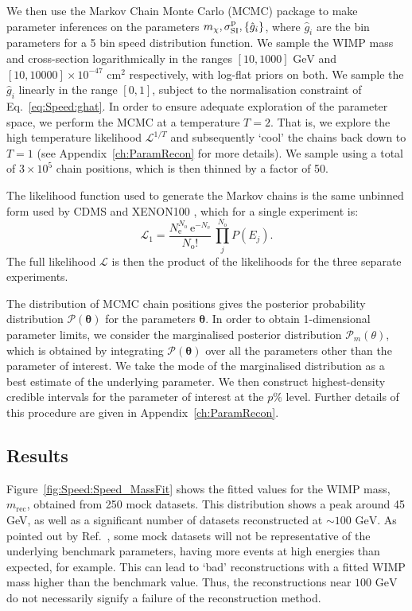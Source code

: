  We then use the Markov Chain Monte Carlo (MCMC) package \cosmomc \cite{Lewis:2002} to make parameter inferences on the parameters $\mchi, \sigmapsi, \left\{\hat{g}_i\right\}$, where $\hat{g}_i$ are the bin parameters for a 5 bin speed distribution function. We sample the WIMP mass and cross-section logarithmically in the ranges \([10, 1000] \textrm{ GeV}\) and \([10, 10000] \times 10^{-47} \textrm{ cm}^2\) respectively, with log-flat priors on both. We sample the $\hat{g}_i$ linearly in the range $[0,1]$, subject to the normalisation constraint of Eq.~\ref{eq:Speed:ghat}. In order to ensure adequate exploration of the parameter space, we perform the MCMC at a temperature $T=2$. That is, we explore the high temperature likelihood $\mathcal{L}^{1/T}$ and subsequently `cool' the chains back down to $T=1$ (see Appendix~\ref{ch:ParamRecon} for more details). We sample using a total of $3 \times 10^5$ chain positions, which is then thinned by a factor of 50.

The likelihood function used to generate the Markov chains is the same unbinned form used by CDMS \cite{Ahmed:2009b} and XENON100 \cite{Aprile:2011}, which for a single experiment is:
\begin{equation}
\label{eq:Speed:unbinnedL}
\mathcal{L}_1 = \frac{N_\textrm{e}^{N_\textrm{o}}\, \textrm{e}^{-N_\textrm{e}}}{N_\textrm{o}!} \, \prod_j^{N_\textrm{o}} P(E_j).
\end{equation} 
The full likelihood \(\mathcal{L}\) is then the product of the likelihoods for the three separate experiments.

The distribution of MCMC chain positions gives the posterior probability distribution $\mathcal{P}(\mathbf{\theta})$ for the parameters $\mathbf{\theta}$. In order to obtain 1-dimensional parameter limits, we consider the marginalised posterior distribution $\mathcal{P}_m(\theta)$, which is obtained by integrating $\mathcal{P}(\mathbf{\theta})$ over all the parameters other than the parameter of interest. We take the mode of the marginalised distribution as a best estimate of the underlying parameter. We then construct highest-density credible intervals for the parameter of interest at the $p\%$ level. Further details of this procedure are given in Appendix~\ref{ch:ParamRecon}. 

\subsection{Results}
Figure~\ref{fig:Speed:Speed_MassFit} shows the fitted values for the WIMP mass, \(m_\textrm{rec}\), obtained from 250 mock datasets. This distribution shows a peak around 45 GeV, as well as a significant number of datasets reconstructed at \(\sim 100 \textrm{ GeV}\). As pointed out by Ref.\ \cite{Strege:2012}, some mock datasets will not be representative of the underlying benchmark parameters, having more events at high energies than expected, for example. This can lead to `bad' reconstructions with a fitted WIMP mass higher than the benchmark value. Thus, the reconstructions near \(100 \textrm{ GeV}\) do not necessarily signify a failure of the reconstruction method.

